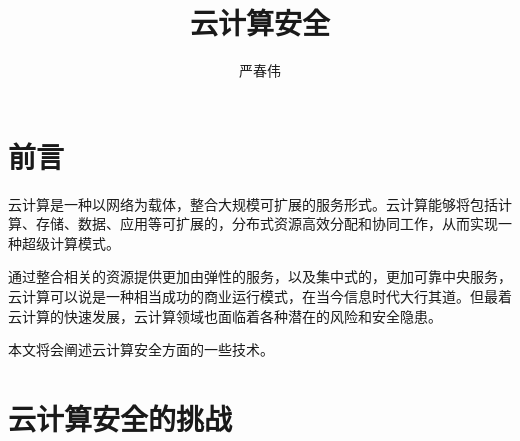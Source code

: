 \documentclass[a4paper]{ctexart}
\author{严春伟}
\title{云计算安全}
\begin{document}
    \maketitle
    \section{前言}
    \par 云计算是一种以网络为载体，整合大规模可扩展的服务形式。云计算能够将包括计算、存储、数据、应用等可扩展的，分布式资源高效分配和协同工作，从而实现一种超级计算模式。 
    \par 通过整合相关的资源提供更加由弹性的服务，以及集中式的，更加可靠中央服务，云计算可以说是一种相当成功的商业运行模式，在当今信息时代大行其道。但最着云计算的快速发展，云计算领域也面临着各种潜在的风险和安全隐患。 
    \par 本文将会阐述云计算安全方面的一些技术。 

    \section{云计算安全的挑战}
\end{document}
